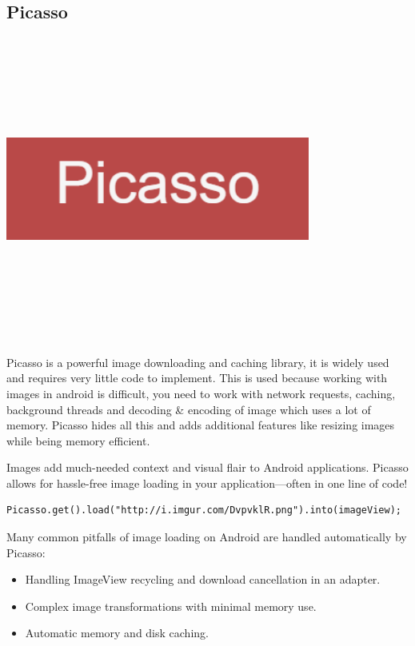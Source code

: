 \subsection{Picasso}
\par
\medskip
\begin{center}
    \includegraphics[width=10cm,height=10cm,keepaspectratio]{Images/picasso.png}
\end{center}
Picasso is a powerful image downloading and caching library, it is widely used and requires very little code to implement.
This is used because working with images in android is difficult, you need to work with network requests, caching, background threads and decoding \& encoding of image which uses a lot of memory. Picasso hides all this and adds additional features like resizing images while being memory efficient.\newline

Images add much-needed context and visual flair to Android applications. Picasso allows for hassle-free image loading in your application—often in one line of code!

\begin{verbatim}
Picasso.get().load("http://i.imgur.com/DvpvklR.png").into(imageView);
\end{verbatim}


Many common pitfalls of image loading on Android are handled automatically by Picasso:
\begin{itemize}
    \item Handling ImageView recycling and download cancellation in an adapter.
    \item Complex image transformations with minimal memory use.
    \item Automatic memory and disk caching.
\end{itemize}

